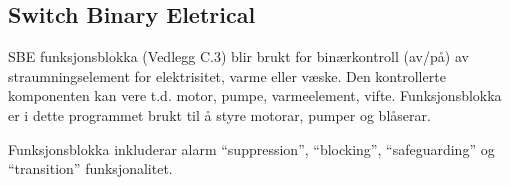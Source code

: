 \newpage

\subsection{Switch Binary Eletrical} 

\gls{SBE} funksjonsblokka (Vedlegg C.3) blir brukt for binærkontroll (av/på) av straumningselement for elektrisitet, varme eller væske. 
Den kontrollerte komponenten kan vere t.d. motor, pumpe, varmeelement, vifte.
Funksjonsblokka er i dette programmet brukt til å styre motorar, pumper og blåserar.



Funksjonsblokka inkluderar alarm ``suppression'', ``blocking'', ``safeguarding'' og ``transition'' funksjonalitet.


